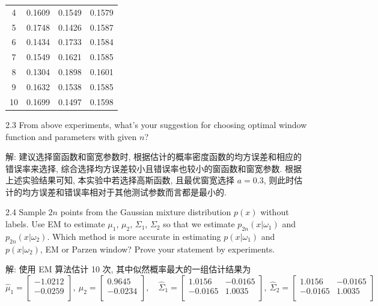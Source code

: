 \documentclass[openany]{ctexbook}
\theoremstyle{kaiti}
\theoremstyle{normal}
\begin{document}
\begin{table}[htbp]
\begin{minipage}{0.4\textwidth}
\begin{tabular}{c|ccc}
      4  & 0.1609 & 0.1549 & 0.1579 \\
      5  & 0.1748 & 0.1426 & 0.1587 \\
      6  & 0.1434 & 0.1733 & 0.1584 \\
      7  & 0.1549 & 0.1621 & 0.1585 \\
      8  & 0.1304 & 0.1898 & 0.1601 \\
      9  & 0.1632 & 0.1538 & 0.1585 \\
      10 & 0.1699 & 0.1497 & 0.1598 \\
      \hline
    \end{tabular}
  \end{minipage}
\end{table}

2.3 From above experiments, what's your suggestion for choosing optimal window function and parameters with given $n$?

解: 建议选择窗函数和窗宽参数时, 根据估计的概率密度函数的均方误差和相应的错误率来选择, 综合选择均方误差较小且错误率也较小的窗函数和窗宽参数. 根据上述实验结果可知, 本实验中若选择高斯函数, 且最优窗宽选择 $a=0.3$, 则此时估计的均方误差和错误率相对于其他测试参数而言都是最小的.

2.4 Sample $2n$ points from the Gaussian mixture distribution $p(x)$ without labels. Use EM to estimate $\mu_{1}$, $\mu_{2}$, $\Sigma_{1}$, $\Sigma_{2}$ so that we estimate $p_{2n}(x|\omega_{1})$ and $p_{2n}(x|\omega_{2})$. Which method is more accurate in estimating $p(x|\omega_{1})$ and $p(x|\omega_{2})$, EM or Parzen window? Prove your statement by experiments.

解: 使用 EM 算法估计 10 次, 其中似然概率最大的一组估计结果为
\begin{equation}
  \hat{\mu}_1=
    \begin{bmatrix}
      -1.0212 \\ 
      -0.0259 \\
    \end{bmatrix},~
  \hat{\mu}_2=
    \begin{bmatrix}
      0.9645 \\ 
      -0.0234 \\
    \end{bmatrix},\quad
  \hat{\Sigma}_1=
    \begin{bmatrix}
      1.0156 & -0.0165 \\
      -0.0165 & 1.0035 \\
    \end{bmatrix},~
  \hat{\Sigma}_2=
    \begin{bmatrix}
      1.0156 & -0.0165 \\
      -0.0165 & 1.0035 \\
    \end{bmatrix}
\end{equation}
\end{document}
